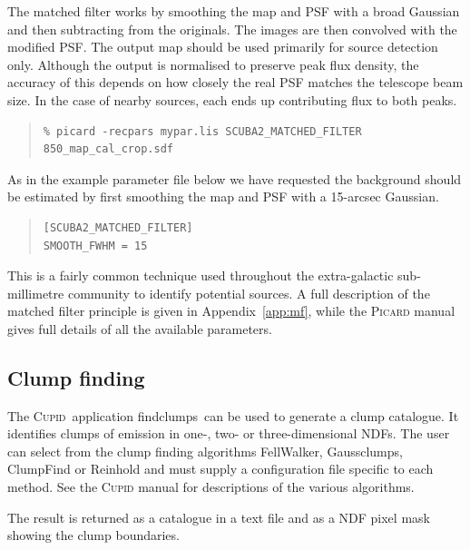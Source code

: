 \documentclass[twoside,11pt]{article}
\newcommand{\htmlref}[2]{#1}
\newcommand{\latex}[1]{#1}
\newcommand{\latexhtml}[2]{#1}
\newcommand{\xref}[3]{#1}
\newcommand{\xlabel}[1]{}
\renewcommand{\_}{\texttt{\symbol{95}}}
\newenvironment{myquote}{\begin{quote}\begin{small}}{\end{small}\end{quote}}
\newcommand{\cupid}{\xref{\textsc{Cupid}}{sun255}{}}
\newcommand{\task}[1]{\textsf{#1}}
\newcommand{\findclumps}{\xref{\task{findclumps}}{sun255}{FINDCLUMPS}}
\newcommand{\cref}[3]{\latexhtml{#1~\ref{#2}}{\htmlref{#3}{#2}}}
\begin{document}
The matched filter works by smoothing the map and PSF with a broad
Gaussian and then subtracting from the originals. The images are then
convolved with the modified PSF. The output map should be used
primarily for source detection only. Although the output is normalised
to preserve peak flux density, the accuracy of this depends on how
closely the real PSF matches the telescope beam size. In the case of
nearby sources, each ends up contributing flux to both peaks.

\begin{myquote}
\begin{verbatim}
% picard -recpars mypar.lis SCUBA2_MATCHED_FILTER 850_map_cal_crop.sdf
\end{verbatim}
\end{myquote}

As in the example parameter file below we have requested the
background should be estimated by first smoothing the map and PSF with
a 15-arcsec Gaussian.
\begin{myquote}
\begin{verbatim}
[SCUBA2_MATCHED_FILTER]
SMOOTH_FWHM = 15
\end{verbatim}
\end{myquote}
\latex{\vspace{4mm}}

This is a fairly common technique used throughout the extra-galactic
sub-millimetre community to identify potential sources. A full
description of the matched filter principle is given in
\cref{Appendix}{app:mf}{SCUBA-2 Matched Filter}, while the \textsc{Picard}
manual gives full details of all the available parameters.

\subsection{\xlabel{clumps}Clump finding}
\label{sec:clumps}
\label{sec:clumpfind}

The \cupid\ application \findclumps\ can be used to generate a clump
catalogue. It identifies clumps of emission in one-, two- or
three-dimensional NDFs. The user can select from the clump finding
algorithms FellWalker, Gaussclumps, ClumpFind or Reinhold and must
supply a configuration file specific to each method. See the
\xref{\textsc{Cupid} manual}{sun255}{} for descriptions of the various
algorithms.

The result is returned as a catalogue in a text file and as a NDF
pixel mask showing the clump boundaries.
\end{document}
